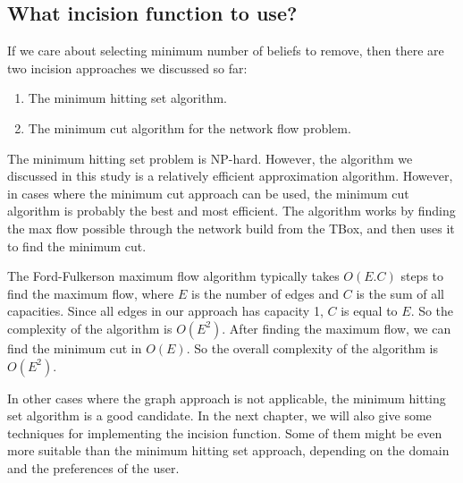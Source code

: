 \subsection{What incision function to use?}
If we care about selecting minimum number of beliefs to remove, then there are two incision approaches we discussed so far:
\begin{enumerate}
\item The minimum hitting set algorithm.
\item The minimum cut algorithm for the network flow problem.
\end{enumerate}
The minimum hitting set problem is NP-hard. However, the algorithm we discussed in this study is a relatively efficient approximation algorithm. However, in cases where the minimum cut approach can be used, the minimum cut algorithm is probably the best and most efficient. The algorithm works by finding the max flow possible through the network build from the TBox, and then uses it to find the minimum cut.

The Ford-Fulkerson maximum flow algorithm typically takes $O(E.C)$ steps to find the maximum flow, where $E$ is the number of edges and $C$ is the sum of all capacities. Since all edges in our approach has capacity 1, $C$ is equal to $E$. So the complexity of the algorithm is $O(E^2)$. After finding the maximum flow, we can find the minimum cut in $O(E)$. So the overall complexity of the algorithm is $O(E^2)$.

In other cases where the graph approach is not applicable, the minimum hitting set algorithm is a good candidate. In the next chapter, we will also give some techniques for implementing the incision function. Some of them might be even more suitable than the minimum hitting set approach, depending on the domain and the preferences of the user.